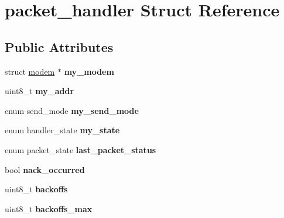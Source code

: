\hypertarget{structpacket__handler}{}\section{packet\+\_\+handler Struct Reference}
\label{structpacket__handler}
\subsection*{Public Attributes}
\begin{DoxyCompactItemize}
\item 
\mbox{\label{structpacket__handler_a5e31603aa81c5e3a233e85f09630f443}} 
struct \mbox{\hyperlink{structmodem}{modem}} $\ast$ {\bfseries my\+\_\+modem}
\item 
\mbox{\label{structpacket__handler_a4f29d292bd4d2732b7c0b59a1301dcb2}} 
uint8\+\_\+t {\bfseries my\+\_\+addr}
\item 
\mbox{\label{structpacket__handler_a42b31c85f9e7c6d40673e279c1506076}} 
enum send\+\_\+mode {\bfseries my\+\_\+send\+\_\+mode}
\item 
\mbox{\label{structpacket__handler_a66f2408583b84777de353d0d5955c153}} 
enum handler\+\_\+state {\bfseries my\+\_\+state}
\item 
\mbox{\label{structpacket__handler_ac93844a789a1027582e7b32917468e34}} 
enum packet\+\_\+state {\bfseries last\+\_\+packet\+\_\+status}
\item 
\mbox{\label{structpacket__handler_a8ac1ba5fd97235efa70445eaf7538b28}} 
bool {\bfseries nack\+\_\+occurred}
\item 
\mbox{\label{structpacket__handler_ace8e4c388c89ec6bee329f46f4244688}} 
uint8\+\_\+t {\bfseries backoffs}
\item 
\mbox{\label{structpacket__handler_a840afb7b3624f7610e5eb09fd3cebd08}} 
uint8\+\_\+t {\bfseries backoffs\+\_\+max}
\item 
\mbox{\label{structpacket__handler_ab717deca06abb0b04f696c14a7231312}} 

\end{DoxyCompactItemize}

